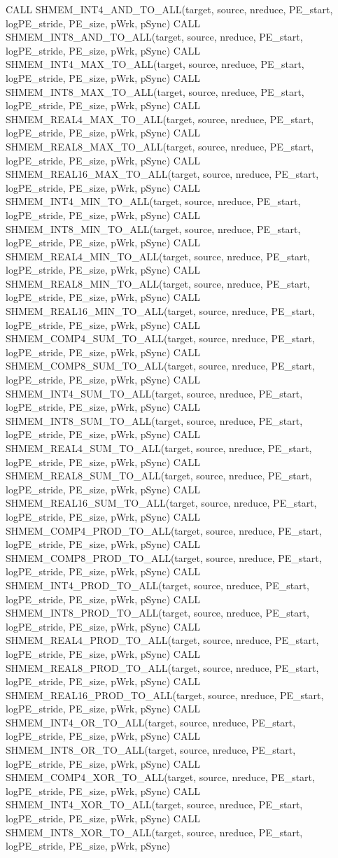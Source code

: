 \synF %
CALL SHMEM_INT4_AND_TO_ALL(target, source, nreduce, PE_start, logPE_stride, PE_size, pWrk, pSync)
CALL SHMEM_INT8_AND_TO_ALL(target, source, nreduce, PE_start, logPE_stride, PE_size, pWrk, pSync)
CALL SHMEM_INT4_MAX_TO_ALL(target, source, nreduce, PE_start, logPE_stride, PE_size, pWrk, pSync)
CALL SHMEM_INT8_MAX_TO_ALL(target, source,	 nreduce, PE_start, logPE_stride, PE_size, pWrk, pSync)
CALL SHMEM_REAL4_MAX_TO_ALL(target, source, nreduce, PE_start, logPE_stride, PE_size, pWrk, pSync)
CALL SHMEM_REAL8_MAX_TO_ALL(target,	source, nreduce, PE_start, logPE_stride, PE_size, pWrk, pSync)
CALL SHMEM_REAL16_MAX_TO_ALL(target, source, nreduce, PE_start, logPE_stride, PE_size, pWrk, pSync)
CALL SHMEM_INT4_MIN_TO_ALL(target, source, nreduce, PE_start, logPE_stride, PE_size, pWrk, pSync)
CALL SHMEM_INT8_MIN_TO_ALL(target, source, nreduce, PE_start, logPE_stride, PE_size, pWrk, pSync)
CALL SHMEM_REAL4_MIN_TO_ALL(target, source, nreduce, PE_start, logPE_stride, PE_size, pWrk, pSync)
CALL SHMEM_REAL8_MIN_TO_ALL(target, source, nreduce, PE_start, logPE_stride, PE_size, pWrk, pSync)
CALL SHMEM_REAL16_MIN_TO_ALL(target, source, nreduce, PE_start, logPE_stride, PE_size, pWrk, pSync)
CALL SHMEM_COMP4_SUM_TO_ALL(target,	 source, nreduce, PE_start, logPE_stride, PE_size, pWrk, pSync)
CALL SHMEM_COMP8_SUM_TO_ALL(target, source, nreduce, PE_start, logPE_stride, PE_size, pWrk, pSync)
CALL SHMEM_INT4_SUM_TO_ALL(target, source, nreduce, PE_start, logPE_stride, PE_size, pWrk, pSync)
CALL SHMEM_INT8_SUM_TO_ALL(target, source, nreduce, PE_start, logPE_stride, PE_size, pWrk, pSync)
CALL SHMEM_REAL4_SUM_TO_ALL(target, source, nreduce, PE_start, logPE_stride, PE_size, pWrk, pSync)
CALL SHMEM_REAL8_SUM_TO_ALL(target, source, nreduce, PE_start, logPE_stride, PE_size, pWrk, pSync)
CALL SHMEM_REAL16_SUM_TO_ALL(target, source, nreduce, PE_start, logPE_stride, PE_size, pWrk, pSync)
CALL SHMEM_COMP4_PROD_TO_ALL(target, source, nreduce, PE_start, logPE_stride, PE_size, pWrk, pSync)
CALL SHMEM_COMP8_PROD_TO_ALL(target, source, nreduce, PE_start, logPE_stride, PE_size, pWrk, pSync)
CALL SHMEM_INT4_PROD_TO_ALL(target, source, nreduce, PE_start, logPE_stride, PE_size, pWrk, pSync)
CALL SHMEM_INT8_PROD_TO_ALL(target, source, nreduce, PE_start, logPE_stride, PE_size, pWrk, pSync)
CALL SHMEM_REAL4_PROD_TO_ALL(target, source, nreduce, PE_start, logPE_stride, PE_size, pWrk, pSync)
CALL SHMEM_REAL8_PROD_TO_ALL(target, source, nreduce, PE_start, logPE_stride, PE_size, pWrk, pSync)
CALL SHMEM_REAL16_PROD_TO_ALL(target, source, nreduce, PE_start, logPE_stride, PE_size, pWrk, pSync)
CALL SHMEM_INT4_OR_TO_ALL(target,	 source, nreduce, PE_start, logPE_stride, PE_size, pWrk, pSync)
CALL SHMEM_INT8_OR_TO_ALL(target,	source,	 nreduce, PE_start, logPE_stride, PE_size, pWrk, pSync)	
CALL SHMEM_COMP4_XOR_TO_ALL(target, source, nreduce, PE_start, logPE_stride, PE_size, pWrk, pSync)
CALL SHMEM_INT4_XOR_TO_ALL(target, source, nreduce, PE_start, logPE_stride, PE_size, pWrk, pSync)
CALL SHMEM_INT8_XOR_TO_ALL(target, source, nreduce, PE_start, logPE_stride, PE_size, pWrk, pSync)

